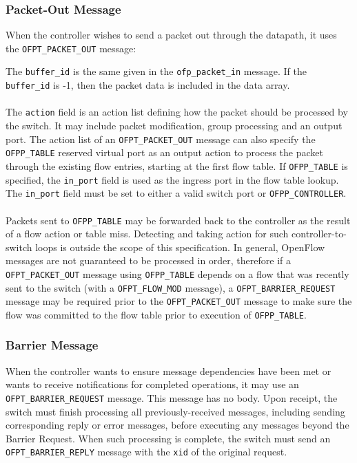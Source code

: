 \subsubsection{Packet-Out Message}
When the controller wishes to send a packet out through the datapath, it uses the \verb|OFPT_PACKET_OUT| message:


The \verb|buffer_id| is the same given in the \verb|ofp_packet_in| message.  If the \verb|buffer_id| is -1, then the packet data is included in the data array.
\\\\
The \verb|action| field is an action list defining how the packet should be processed by the switch. It may include packet modification, group processing and an output port. The action list of an \verb|OFPT_PACKET_OUT| message can also specify the \verb|OFPP_TABLE| reserved virtual port as an output action to process the packet through the existing flow entries, starting at the first flow table. If \verb|OFPP_TABLE| is specified, the \verb|in_port| field is used as the ingress port in the flow table lookup.  The \verb|in_port| field must be set to either a valid switch port or \verb|OFPP_CONTROLLER|.
\\\\
Packets sent to \verb|OFPP_TABLE| may be forwarded back to the controller as the result of a flow action or table miss.  Detecting and taking action for such controller-to-switch loops is outside the scope of this specification. In general, OpenFlow messages are not guaranteed to be processed in order, therefore if a \verb|OFPT_PACKET_OUT| message using \verb|OFPP_TABLE| depends on a flow that was recently sent to the switch (with a \verb|OFPT_FLOW_MOD| message), a \verb|OFPT_BARRIER_REQUEST| message may be required prior to the \verb|OFPT_PACKET_OUT| message to make sure the flow was committed to the flow table prior to execution of \verb|OFPP_TABLE|.

\subsubsection{Barrier Message}
When the controller wants to ensure message dependencies have been met or wants to receive notifications for completed operations, it may use an \verb|OFPT_BARRIER_REQUEST| message.  This message has no body.  Upon receipt, the switch must finish processing all previously-received messages, including sending corresponding reply or error messages, before executing any messages beyond the Barrier Request.  When such processing is complete, the switch must send an \verb|OFPT_BARRIER_REPLY| message with the \verb|xid| of the original request.

